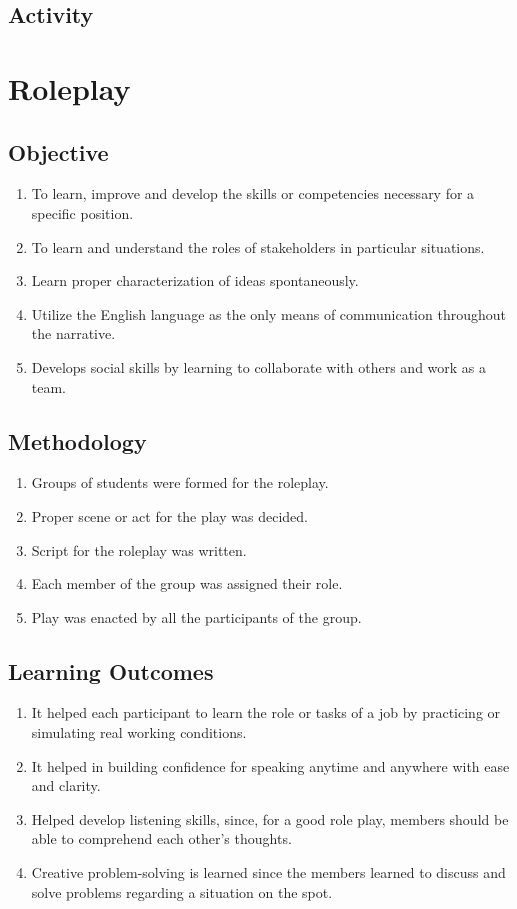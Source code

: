 \subsection{Activity}

\pagebreak

\section{Roleplay}
\label{Roleplay}
\subsection{Objective}
\begin{enumerate}
      \item To learn, improve and develop the skills or competencies necessary for a specific
            position.
      \item To learn and understand the roles of stakeholders in particular situations.
      \item Learn proper characterization of ideas spontaneously.
      \item Utilize the English language as the only means of communication throughout the
            narrative.
      \item Develops social skills by learning to collaborate with others and work as a team.
\end{enumerate}

\subsection{Methodology}
\begin{enumerate}
      \item Groups of students were formed for the roleplay.
      \item Proper scene or act for the play was decided.
      \item Script for the roleplay was written.
      \item Each member of the group was assigned their role.
      \item Play was enacted by all the participants of the group.
\end{enumerate}

\subsection{Learning Outcomes}
\begin{enumerate}
      \item It helped each participant to learn the role or tasks of a job by practicing or simulating
            real working conditions.
      \item It helped in building confidence for speaking anytime and anywhere with ease and
            clarity.
      \item Helped develop listening skills, since, for a good role play, members should be able
            to comprehend each other's thoughts.
      \item Creative problem-solving is learned since the members learned to discuss and solve
            problems regarding a situation on the spot.
\end{enumerate}

